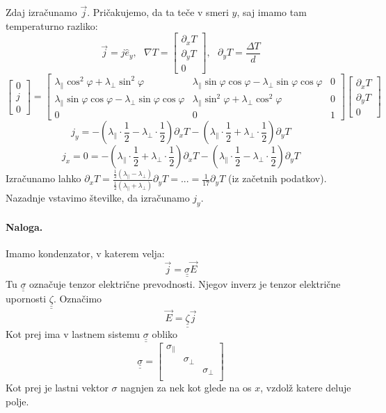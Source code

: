 \documentclass[a4paper]{article}
\newcommand{\vct}[1]{\overrightarrow{#1}}
\newcommand{\duline}[1]{\underline{\underline{#1}}}
\begin{document}
Zdaj izračunamo $\vct{j}$. Pričakujemo, da ta teče v smeri $y$, saj imamo tam temperaturno razliko:
$$\vct{j} = j\hat{e}_y,~~~
\nabla T = \begin{bmatrix}
    \partial_xT \\
    \partial_yT \\
    0
\end{bmatrix},~~~\partial_yT = \frac{\Delta T}{d}$$
$$\begin{bmatrix}
    0 \\ j \\ 0
\end{bmatrix} = \begin{bmatrix}
    \lambda_\parallel\cos^2\varphi + \lambda_\perp\sin^2\varphi & \lambda_\parallel\sin\varphi\cos\varphi - \lambda_\perp\sin\varphi\cos\varphi & 0 \\
    \lambda_\parallel\sin\varphi\cos\varphi - \lambda_\perp\sin\varphi\cos\varphi & \lambda_\parallel\sin^2\varphi + \lambda_\perp\cos^2\varphi & 0 \\
    0 & 0 & 1
\end{bmatrix}\begin{bmatrix}
    \partial_xT \\
    \partial_yT \\
    0
\end{bmatrix}$$
$$j_y = -\left(\lambda_\parallel \cdot \frac{1}{2} - \lambda_\perp\cdot\frac{1}{2}\right)\partial_xT - \left(\lambda_\parallel\cdot\frac{1}{2} + \lambda_\perp\cdot\frac{1}{2}\right)\partial_yT$$
$$j_x = 0 = -\left(\lambda_\parallel \cdot \frac{1}{2} + \lambda_\perp\cdot\frac{1}{2}\right)\partial_xT - \left(\lambda_\parallel\cdot\frac{1}{2} - \lambda_\perp\cdot\frac{1}{2}\right)\partial_yT$$
Izračunamo lahko $\displaystyle{\partial_xT = \frac{\frac{1}{2}(\lambda_\parallel - \lambda_\perp)}{\frac{1}{2}(\lambda_\parallel + \lambda_\perp)}\partial_yT = ... = \frac{1}{17}\partial_yT}$ (iz začetnih podatkov).
Nazadnje vstavimo številke, da izračunamo $j_y$.
\paragraph{Naloga.} Imamo kondenzator, v katerem velja:
$$\vct{j} = \duline{\sigma}\vct{E}$$
Tu $\duline{\sigma}$ označuje tenzor električne prevodnosti. Njegov inverz je tenzor električne upornosti $\duline{\zeta}$. Označimo
$$\vct{E} = \duline{\zeta}\vct{j}$$
Kot prej ima v lastnem sistemu $\duline{\sigma}$ obliko
$$\duline{\sigma} = \begin{bmatrix}
    \sigma_\parallel && \\
    & \sigma_\perp & \\
    & & \sigma_\perp \\ 
\end{bmatrix}$$ Kot prej je lastni vektor $\sigma$ nagnjen za nek kot glede na os $x$, vzdolž katere deluje polje.
\end{document}
